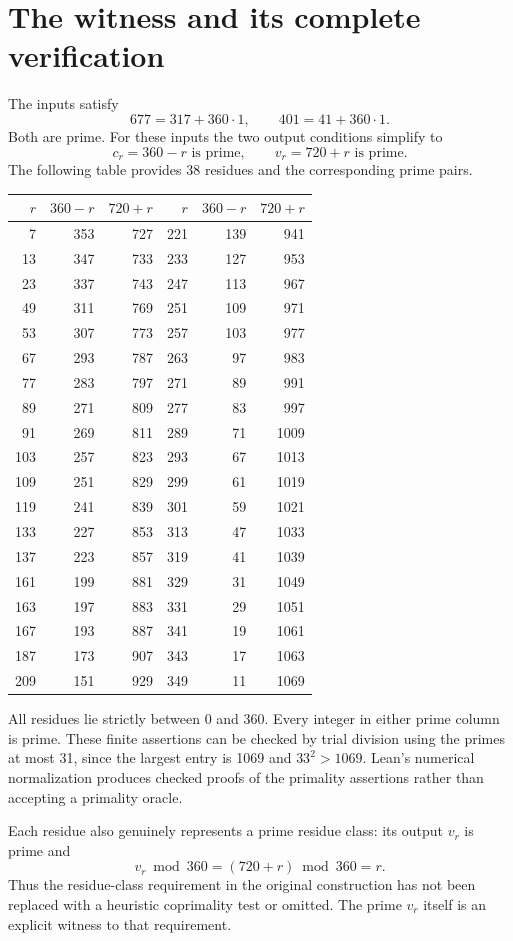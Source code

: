 \documentclass[11pt]{article}
\begin{document}
\section{The witness and its complete verification}
The inputs satisfy
\[
 677=317+360\cdot1,\qquad401=41+360\cdot1.
\]
Both are prime. For these inputs the two output conditions simplify to
\[
 c_r=360-r\text{ is prime},\qquad v_r=720+r\text{ is prime}.
\]
The following table provides 38 residues and the corresponding prime pairs.
\begin{center}\small
\begin{tabular}{rrr@{\hspace{1cm}}rrr}
\toprule
$r$ & $360-r$ & $720+r$ & $r$ & $360-r$ & $720+r$\\
\midrule
7&353&727&221&139&941\\
13&347&733&233&127&953\\
23&337&743&247&113&967\\
49&311&769&251&109&971\\
53&307&773&257&103&977\\
67&293&787&263&97&983\\
77&283&797&271&89&991\\
89&271&809&277&83&997\\
91&269&811&289&71&1009\\
103&257&823&293&67&1013\\
109&251&829&299&61&1019\\
119&241&839&301&59&1021\\
133&227&853&313&47&1033\\
137&223&857&319&41&1039\\
161&199&881&329&31&1049\\
163&197&883&331&29&1051\\
167&193&887&341&19&1061\\
187&173&907&343&17&1063\\
209&151&929&349&11&1069\\
\bottomrule
\end{tabular}
\end{center}
All residues lie strictly between 0 and 360. Every integer in either prime column is prime. These finite assertions can be checked by trial division using the primes at most 31, since the largest entry is 1069 and $33^2>1069$. Lean's numerical normalization produces checked proofs of the primality assertions rather than accepting a primality oracle.

Each residue also genuinely represents a prime residue class: its output $v_r$ is prime and
\[
 v_r\bmod360=(720+r)\bmod360=r.
\]
Thus the residue-class requirement in the original construction has not been replaced with a heuristic coprimality test or omitted. The prime $v_r$ itself is an explicit witness to that requirement.
\end{document}
